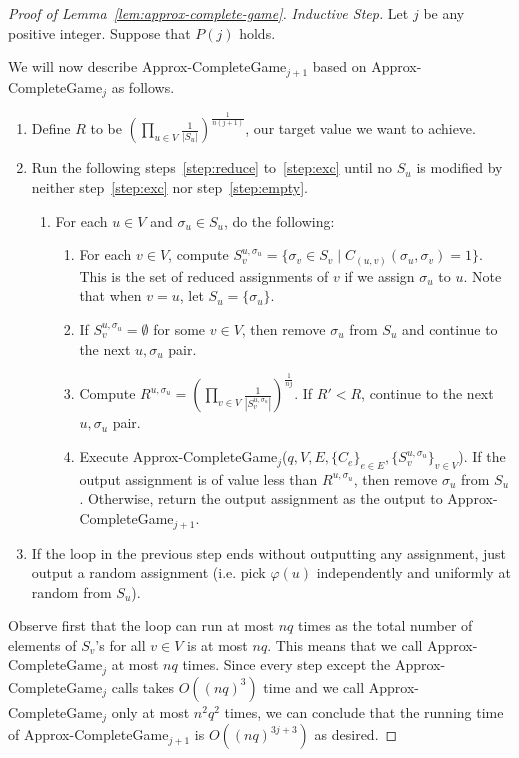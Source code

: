 \documentclass{article}
\begin{document}
\begin{proof}[Proof of Lemma~\ref{lem:approx-complete-game}]
{\em Inductive Step.} Let $j$ be any positive integer. Suppose that $P(j)$ holds.

We will now describe {\sc Approx-CompleteGame$_{j+1}$} based on {\sc Approx-CompleteGame$_j$} as follows.

\begin{enumerate}
\item Define $R$ to be $\left(\prod_{u \in V} \frac{1}{|S_u|}\right)^{\frac{1}{n(j + 1)}}$, our target value we want to achieve.
\item Run the following steps~\ref{step:reduce} to~\ref{step:exc} until no $S_u$ is modified by neither step~\ref{step:exc} nor step~\ref{step:empty}.
  \begin{enumerate}
  \item For each $u \in V$ and $\sigma_u \in S_u$, do the following:
    \begin{enumerate}
    \item For each $v \in V$, compute $S_v^{u, \sigma_u} = \{\sigma_v \in S_v \mid C_{(u, v)}(\sigma_u, \sigma_v) = 1\}$. This is the set of reduced assignments of $v$ if we assign $\sigma_u$ to $u$. Note that when $v = u$, let $S_u = \{\sigma_u\}$. \label{step:reduce}
    \item If $S_v^{u, \sigma_u} = \emptyset$ for some $v \in V$, then remove $\sigma_u$ from $S_u$ and continue to the next $u, \sigma_u$ pair. \label{step:empty}
    \item Compute $R^{u, \sigma_u} = \left(\prod_{v \in V} \frac{1}{|S_v^{u, \sigma_u}|}\right)^{\frac{1}{nj}}$. If $R' < R$, continue to the next $u, \sigma_u$ pair.
    \item Execute {\sc Approx-CompleteGame$_j$}($q, V, E, \{C_{e}\}_{e \in E}, \{S_v^{u, \sigma_u}\}_{v \in V}$). If the output assignment is of value less than $R^{u, \sigma_u}$, then remove $\sigma_u$ from $S_u$. Otherwise, return the output assignment as the output to {\sc Approx-CompleteGame$_{j+1}$}. \label{step:exc}
    \end{enumerate}
  \end{enumerate}
\item If the loop in the previous step ends without outputting any assignment, just output a random assignment (i.e. pick $\varphi(u)$ independently and uniformly at random from $S_u$). \label{step:random-assignment}
\end{enumerate}

Observe first that the loop can run at most $nq$ times as the total number of elements of $S_v$'s for all $v \in V$ is at most $nq$. This means that we call {\sc Approx-CompleteGame$_{j}$} at most $nq$ times. Since every step except the {\sc Approx-CompleteGame$_{j}$} calls takes $O((nq)^3)$ time and we call {\sc Approx-CompleteGame$_{j}$} only at most $n^2q^2$ times, we can conclude that the running time of {\sc Approx-CompleteGame$_{j+1}$} is $O((nq)^{3j+3})$ as desired.


\end{proof}
\end{document}
